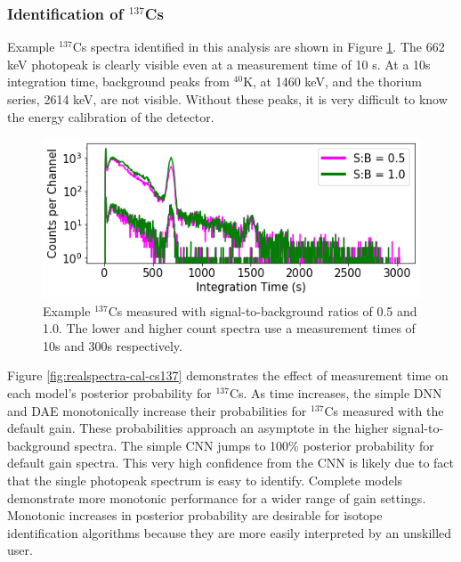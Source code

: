 \subsubsection{Identification of $^{137}$Cs}

Example $^{137}$Cs spectra identified in this analysis are shown in Figure \ref{fig:realspectra-cal-cs137-spec}. The 662 keV photopeak is clearly visible even at a measurement time of 10 s. At a 10s integration time, background peaks from $^{40}$K, at 1460 keV, and the thorium series, 2614 keV, are not visible. Without these peaks, it is very difficult to know the energy calibration of the detector.

\begin{figure}[H]
	\centering
	\includegraphics[width=0.85\linewidth]{images/realspectra-cal-cs137-spec}
	\caption{Example $^{137}$Cs measured with signal-to-background ratios of 0.5 and 1.0. The lower and higher count spectra use a measurement times of 10s and 300s respectively.}
	\label{fig:realspectra-cal-cs137-spec}
\end{figure}

Figure \ref{fig:realspectra-cal-cs137} demonstrates the effect of measurement time on each model's posterior probability for $^{137}$Cs. As time increases, the simple DNN and DAE monotonically increase their probabilities for $^{137}$Cs measured with the default gain. These probabilities approach an asymptote in the higher signal-to-background spectra. The simple CNN jumps to 100\% posterior probability for default gain spectra. This very high confidence from the CNN is likely due to fact that the single photopeak spectrum is easy to identify. Complete models demonstrate more monotonic performance for a wider range of gain settings. Monotonic increases in posterior probability are desirable for isotope identification algorithms because they are more easily interpreted by an unskilled user.

